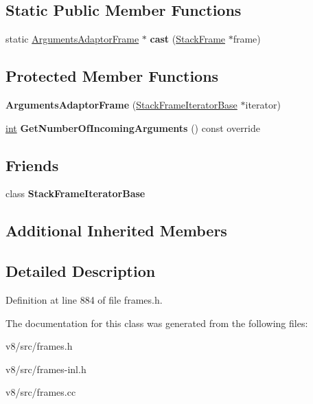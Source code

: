 \subsection*{Static Public Member Functions}
\begin{DoxyCompactItemize}
\item 
\mbox{\label{classv8_1_1internal_1_1ArgumentsAdaptorFrame_a6b8283fe3991c88663621fdf586b67ca}} 
static \mbox{\hyperlink{classv8_1_1internal_1_1ArgumentsAdaptorFrame}{Arguments\+Adaptor\+Frame}} $\ast$ {\bfseries cast} (\mbox{\hyperlink{classv8_1_1internal_1_1StackFrame}{Stack\+Frame}} $\ast$frame)
\end{DoxyCompactItemize}
\subsection*{Protected Member Functions}
\begin{DoxyCompactItemize}
\item 
\mbox{\label{classv8_1_1internal_1_1ArgumentsAdaptorFrame_ac2681526413000e2f5879bc2c0b0fd2f}} 
{\bfseries Arguments\+Adaptor\+Frame} (\mbox{\hyperlink{classv8_1_1internal_1_1StackFrameIteratorBase}{Stack\+Frame\+Iterator\+Base}} $\ast$iterator)
\item 
\mbox{\label{classv8_1_1internal_1_1ArgumentsAdaptorFrame_a4e9a7abe3bd4836a80cd691e91f92aaf}} 
\mbox{\hyperlink{classint}{int}} {\bfseries Get\+Number\+Of\+Incoming\+Arguments} () const override
\end{DoxyCompactItemize}
\subsection*{Friends}
\begin{DoxyCompactItemize}
\item 
\mbox{\label{classv8_1_1internal_1_1ArgumentsAdaptorFrame_ac7310421866976ca454bbe11c5f926c3}} 
class {\bfseries Stack\+Frame\+Iterator\+Base}
\end{DoxyCompactItemize}
\subsection*{Additional Inherited Members}


\subsection{Detailed Description}


Definition at line 884 of file frames.\+h.



The documentation for this class was generated from the following files\+:\begin{DoxyCompactItemize}
\item 
v8/src/frames.\+h\item 
v8/src/frames-\/inl.\+h\item 
v8/src/frames.\+cc\end{DoxyCompactItemize}
